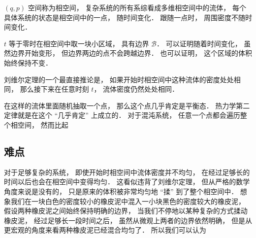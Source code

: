 
\begin{issues}
\issueDraft
\end{issues}

$(q, p)$ 空间称为相空间， 复杂系统的所有系综看成多维相空间中的流体， 每个具体系统的状态是相空间中的一点， 随时间变化． 跟随一点时， 周围密度不随时间变化．

$t$ 等于零时在相空间中取一块小区域， 具有边界 $\mathcal B$． 可以证明随着时间变化， 虽然边界开始变形， 但边界两边的点不会跨越边界． 也可以证明， 这个区域的体积始终保持不变．

刘维尔定理的一个最直接推论是， 如果开始时相空间中这种流体的密度处处相同， 那么接下来在任意时刻 $t$， 流体密度仍然处处相同．

在这样的流体里面随机抽取一个点， 那么这个点几乎肯定是平衡态． 热力学第二定律就是在这个 “几乎肯定” 上成立的． 对于混沌系统， 任意一个点都会遍历整个相空间， 然而比起

\subsection{难点}
对于足够复杂的系统， 即使开始时相空间中流体密度并不均匀， 在经过足够长的时间以后也会在相空间中变得均匀． 这看似违背了刘维尔定理， 但从严格的数学角度来说是没有的， 只是原来的体积被非常均匀地 “揉” 到了整个相空间中． 想象我们在一块白色的密度较小的橡皮泥中混入一小块黑色的密度较大的橡皮泥， 假设两种橡皮泥之间始终保持明确的边界， 当我们不停地以某种复杂的方式揉动橡皮泥， 经过足够长一段时间之后， 虽然从微观上两者的边界依然明确， 但是从更宏观的角度来看两种橡皮泥已经混合均匀了． 所以我们可以认为
